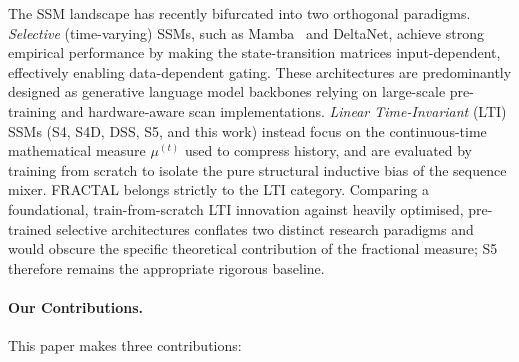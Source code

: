 \documentclass{article}
\theoremstyle{plain}
\theoremstyle{definition}
\theoremstyle{remark}
\begin{document}
The SSM landscape has recently bifurcated into two orthogonal paradigms. \textit{Selective} (time-varying) SSMs, such as Mamba~\citep{gu2024mamba} and DeltaNet, achieve strong empirical performance by making the state-transition matrices input-dependent, effectively enabling data-dependent gating. These architectures are predominantly designed as generative language model backbones relying on large-scale pre-training and hardware-aware scan implementations. \textit{Linear Time-Invariant} (LTI) SSMs (S4, S4D, DSS, S5, and this work) instead focus on the continuous-time mathematical measure $\mu^{(t)}$ used to compress history, and are evaluated by training from scratch to isolate the pure structural inductive bias of the sequence mixer. FRACTAL belongs strictly to the LTI category. Comparing a foundational, train-from-scratch LTI innovation against heavily optimised, pre-trained selective architectures conflates two distinct research paradigms and would obscure the specific theoretical contribution of the fractional measure; S5 therefore remains the appropriate rigorous baseline.

\paragraph{Our Contributions.}
\label{sec:contributions}

This paper makes three contributions:

%
%
\end{document}
